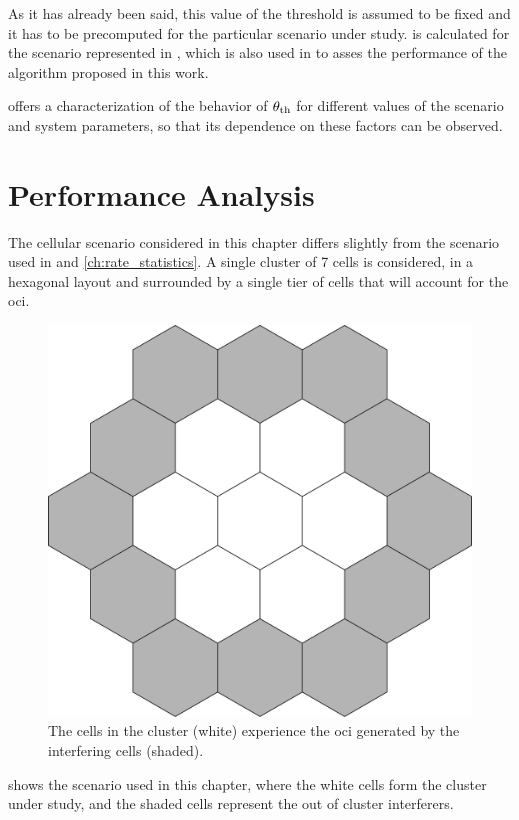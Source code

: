 As it has already been said, this value of the threshold is assumed to be fixed
and it has to be precomputed for the particular scenario under study.
 is calculated for the scenario represented in
, which is also used in
 to asses the performance of the algorithm proposed
in this work.

 offers a characterization of the behavior of $\theta_{\text{th}}$ for
different values of the scenario and system parameters, so that its dependence
on these factors can be observed.

\section{Performance Analysis}\label{sec:sched_performance}

The cellular scenario considered in this chapter differs slightly from the
scenario used in  and \ref{ch:rate_statistics}. A single
cluster of 7 cells is considered, in a hexagonal layout and surrounded by a
single tier of cells that will account for the \gls{oci}.

\begin{figure}[t]
    \centering
    \includegraphics[width=0.75\columnwidth]{./12.simple_threshold_scheduling/img/scenario}
    \caption{The cells in the cluster (white) experience the \gls{oci} generated
    by the interfering cells (shaded).}
    \label{fig:scenario_threshold}
\end{figure}

 shows the scenario used in this chapter, where the
white cells form the cluster under study, and the shaded cells represent the out
of cluster interferers.

